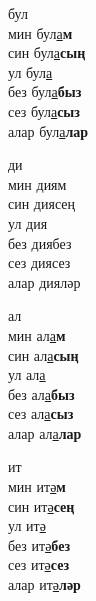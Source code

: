 \begin{multicols}{4}
\begin{enumerate}
\begin{minipage}{\linewidth}
    \item
    бул\\
    мин бул\underline{а}\textbf{м}\\
    син бул\underline{а}\textbf{сың}\\
    ул бул\underline{а}\\
    без бул\underline{а}\textbf{быз}\\
    сез бул\underline{а}\textbf{сыз}\\
    алар бул\underline{а}\textbf{лар}\\
\end{minipage}

\begin{minipage}{\linewidth}
    \item
    ди\\
    мин диям\\
    син диясең\\
    ул дия\\
    без диябез\\
    сез диясез\\
    алар дияләр\\
\end{minipage}

\begin{minipage}{\linewidth}
    \item
    ал\\
    мин ал\underline{а}\textbf{м}\\
    син ал\underline{а}\textbf{сың}\\
    ул ал\underline{а}\\
    без ал\underline{а}\textbf{быз}\\
    сез ал\underline{а}\textbf{сыз}\\
    алар ал\underline{а}\textbf{лар}\\
\end{minipage}

\begin{minipage}{\linewidth}
    \item
    ит\\
    мин ит\underline{ә}\textbf{м}\\
    син ит\underline{ә}\textbf{сең}\\
    ул ит\underline{ә}\\
    без ит\underline{ә}\textbf{без}\\
    сез ит\underline{ә}\textbf{сез}\\
    алар ит\underline{ә}\textbf{ләр}\\
\end{minipage}


\end{enumerate}
\end{multicols}
